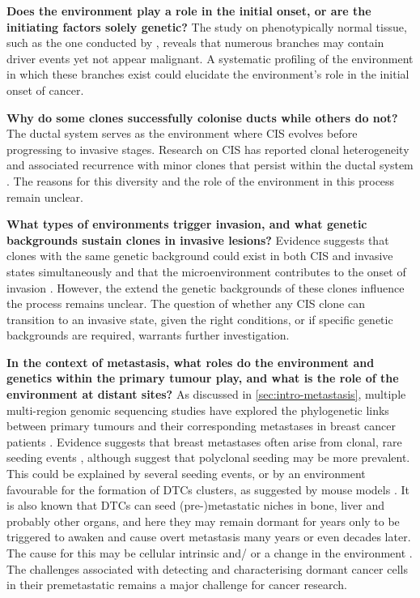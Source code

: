 \textbf{Does the environment play a role in the initial onset, or are the initiating factors solely genetic?} The study on phenotypically normal tissue, such as the one conducted by \textcite{Nishimura2023-mk}, reveals that numerous branches may contain driver events yet not appear malignant. A systematic profiling of the environment in which these branches exist could elucidate the environment's role in the initial onset of cancer.

\textbf{Why do some clones successfully colonise ducts while others do not?} The ductal system serves as the environment where \ac{CIS} evolves before progressing to invasive stages. Research on \ac{CIS} has reported clonal heterogeneity \parencite{Nishimura2023-mk, Yates2015-xk, Casasent2018-gx} and associated recurrence with minor clones that persist within the ductal system \parencite{Lips2022-kv}. The reasons for this diversity and the role of the environment in this process remain unclear.

\textbf{What types of environments trigger invasion, and what genetic backgrounds sustain clones in invasive lesions?} Evidence suggests that clones with the same genetic background could exist in both \ac{CIS} and invasive states simultaneously \parencite{Casasent2018-gx} and that the microenvironment contributes to the onset of invasion \parencite{Sinha2021-mf} . However, the extend the genetic backgrounds of these clones influence the process remains unclear. The question of whether any \ac{CIS} clone can transition to an invasive state, given the right conditions, or if specific genetic backgrounds are required, warrants further investigation.

\textbf{In the context of metastasis, what roles do the environment and genetics within the primary tumour play, and what is the role of the environment at distant sites?} As discussed in \cref{sec:intro-metastasis}, multiple multi-region genomic sequencing studies have explored the phylogenetic links between primary tumours and their corresponding metastases in breast cancer patients \parencite{De_Mattos-Arruda2019-sb,Yates2015-xk,Yates2017-xc,Brown2017-de}. Evidence suggests that breast metastases often arise from clonal, rare seeding events \parencite{Brown2017-de, De_Mattos-Arruda2019-sb}, although \textcite{De_Mattos-Arruda2019-sb} suggest that polyclonal seeding may be more prevalent. This could be explained by several seeding events, or by an environment favourable for the formation of \acp{DTC} clusters, as suggested by mouse models \parencite{Cheung2016-nb}. It is also known that \acp{DTC} can seed (pre-)metastatic niches in bone, liver and probably other organs, and here they may remain dormant for years only to be triggered to awaken and cause overt metastasis many years or even decades later. The cause for this may be cellular intrinsic and/ or a change in the environment \parencite{Szczerba2019-mt,Diamantopoulou2022-sb}. The challenges associated with detecting and characterising dormant cancer cells in their premetastatic remains a major challenge for cancer research.

